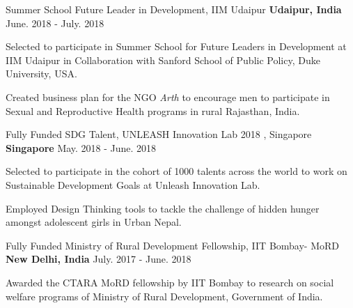 \begin{cventries}
\cventry
{Summer School} %
{Future Leader in Development, IIM Udaipur} %
{\textbf{Udaipur, India}} %
{June. 2018 - July. 2018} %
{ %
\begin{cvitems}
\item {Selected to participate in Summer School for Future Leaders in Development at IIM Udaipur in Collaboration with Sanford School of Public Policy, Duke University, USA.}
\item {Created business plan for the NGO \textit{Arth} to encourage men to participate in Sexual and Reproductive Health programs in rural Rajasthan, India.}
\end{cvitems}
}



\cventry
{Fully Funded} %
{SDG Talent, UNLEASH Innovation Lab 2018 , Singapore} %
{\textbf{Singapore}} %
{May. 2018 - June. 2018} %
{ %
\begin{cvitems}
\item {Selected to participate in the cohort of 1000 talents across the world to work on Sustainable Development Goals at Unleash Innovation Lab.}
\item {Employed Design Thinking tools to tackle the challenge of hidden hunger amongst adolescent girls in Urban Nepal.}
\end{cvitems}
}


\cventry
{Fully Funded} %
{Ministry of Rural Development Fellowship, IIT Bombay- MoRD} %
{\textbf{New Delhi, India}} %
{July. 2017 - June. 2018} %
{ %
\begin{cvitems}
\item {Awarded the CTARA MoRD fellowship by IIT Bombay to research on social welfare programs of Ministry of Rural Development, Government of India.}
\end{cvitems}
}



\end{cventries}